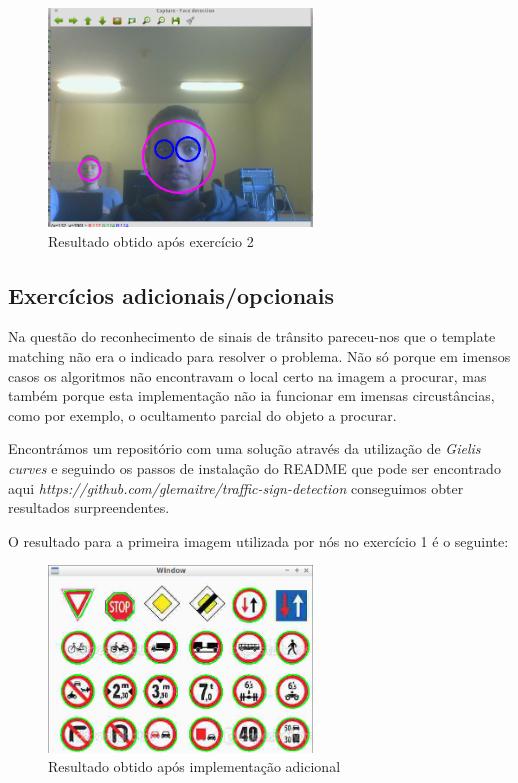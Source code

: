 \documentclass[portuguese, times, mirror]{revdetua}
\begin{document}
\begin{figure}[ht!]
\centering
\includegraphics[width=70mm]{img/ex2_1.png}
\caption{Resultado obtido após exercício 2}
\end{figure}



\newpage
\subsection{Exercícios adicionais/opcionais}

Na questão do reconhecimento de sinais de trânsito pareceu-nos que o template matching não era o indicado para resolver o problema. Não só porque em imensos casos os algoritmos não encontravam o local certo na imagem a procurar, mas também porque esta implementação não ia funcionar em imensas circustâncias, como por exemplo, o ocultamento parcial do objeto a procurar.

Encontrámos um repositório com uma solução através da utilização de \textit{Gielis curves} e seguindo os passos de instalação do README que pode ser encontrado aqui \textit{https://github.com/glemaitre/traffic-sign-detection} conseguimos obter resultados surpreendentes. 

O resultado para a primeira imagem utilizada por nós no exercício 1 é o seguinte:

\begin{figure}[ht!]
\centering
\includegraphics[width=70mm]{img/ex_adicional.png}
\caption{Resultado obtido após implementação adicional}
\end{figure}
\end{document}
